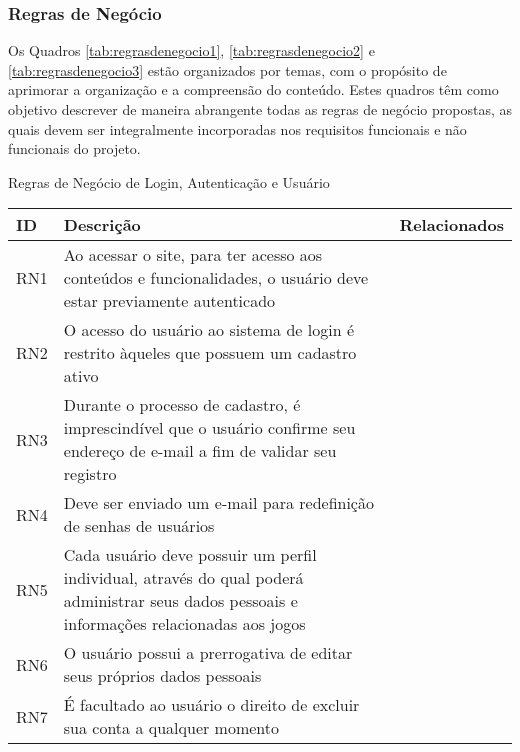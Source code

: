 \subsubsection{Regras de Negócio}
\label{sec:regras_negocio}

Os Quadros \ref{tab:regrasdenegocio1}, \ref{tab:regrasdenegocio2} e \ref{tab:regrasdenegocio3} estão organizados por temas, com o propósito de aprimorar a organização e a compreensão do conteúdo. Estes quadros têm como objetivo descrever de maneira abrangente todas as regras de negócio propostas, as quais devem ser integralmente incorporadas nos requisitos funcionais e não funcionais do projeto.

\begin{quadro}[h!]
\centering
\caption{Regras de Negócio de Login, Autenticação e Usuário}
\label{tab:regrasdenegocio1}
\begin{longtable}{|p{2.5cm}|p{10.0cm}|p{2.5cm}|}
\hline
ID & Descrição & Relacionados
\\\hline
RN1 & Ao acessar o site, para ter acesso aos conteúdos e funcionalidades, o usuário deve estar previamente autenticado &  \
\\\hline
RN2 & O acesso do usuário ao sistema de login é restrito àqueles que possuem um cadastro ativo &  \
\\\hline
RN3 & Durante o processo de cadastro, é imprescindível que o usuário confirme seu endereço de e-mail a fim de validar seu registro &  \
\\\hline
RN4 & Deve ser enviado um e-mail para redefinição de senhas de usuários &  \
\\\hline
RN5 & Cada usuário deve possuir um perfil individual, através do qual poderá administrar seus dados pessoais e informações relacionadas aos jogos &  \
\\\hline
RN6 & O usuário possui a prerrogativa de editar seus próprios dados pessoais &  \
\\\hline
RN7 & É facultado ao usuário o direito de excluir sua conta a qualquer momento &  \
\\\hline
\end{longtable}
\fonte{Os Autores.}
\end{quadro}

